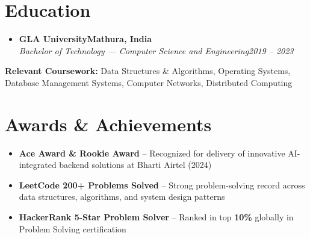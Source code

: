 \documentclass[letterpaper,11pt]{article}
\newcommand{\resumeSubheading}[4]{
  \vspace{-2pt}\item
    \textbf{#1}\hfill \textbf{\small #2} \\
    \textit{\small #3}\hfill \textit{\small #4}\vspace{-7pt}
}
\newcommand{\resumeSubHeadingListStart}{\begin{itemize}[leftmargin=0.0in, label={}]}
\newcommand{\resumeSubHeadingListEnd}{\end{itemize}}
\begin{document}
\section{Education}
  \resumeSubHeadingListStart
    \resumeSubheading
      {GLA University}{Mathura, India}
      {Bachelor of Technology --- Computer Science and Engineering}{2019 -- 2023}
  \resumeSubHeadingListEnd
  \vspace{-2pt}
  \begin{itemize}[leftmargin=0.15in, label={}]
    \small{\item{
      \textbf{Relevant Coursework:} Data Structures \& Algorithms, Operating Systems, Database Management Systems, Computer Networks, Distributed Computing
    }}
  \end{itemize}
\vspace{-4pt}

\section{Awards \& Achievements}
\begin{itemize}[leftmargin=0.15in]
  \item \small{\textbf{Ace Award \& Rookie Award} -- Recognized for delivery of innovative AI-integrated backend solutions at Bharti Airtel (2024)}
  \item \small{\textbf{LeetCode \textbf{200+} Problems Solved} -- Strong problem-solving record across data structures, algorithms, and system design patterns}
  \item \small{\textbf{HackerRank 5-Star Problem Solver} -- Ranked in top \textbf{10\%} globally in Problem Solving certification}
\end{itemize}
\end{document}
